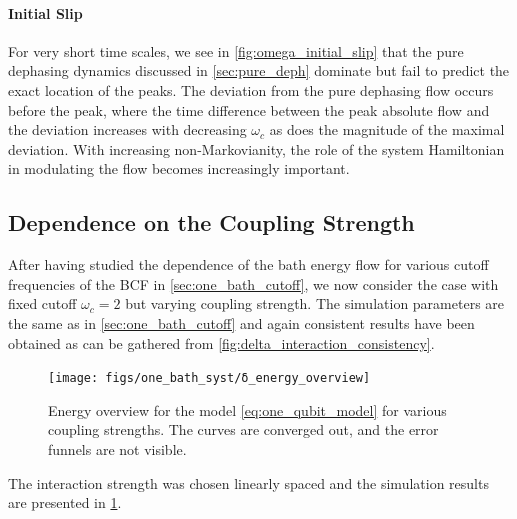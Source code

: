\paragraph{Initial Slip}
For very short time scales, we see in \cref{fig:omega_initial_slip}
that the pure dephasing dynamics discussed in \cref{sec:pure_deph}
dominate but fail to predict the exact location of the peaks. The
deviation from the pure dephasing flow occurs before the peak, where
the time difference between the peak absolute flow and the deviation
increases with decreasing \(ω_c\) as does the magnitude of the maximal
deviation. With increasing non-Markovianity, the role of the system
Hamiltonian in modulating the flow becomes increasingly important.

\subsection{Dependence on the Coupling Strength}
\label{sec:one_bathcoup_strength}
After having studied the dependence of the bath energy flow for
various cutoff frequencies of the BCF in \cref{sec:one_bath_cutoff},
we now consider the case with fixed cutoff \(ω_c=2\) but varying
coupling strength. The simulation parameters are the same as in
\cref{sec:one_bath_cutoff} and again consistent results have been
obtained as can be gathered from
\cref{fig:delta_interaction_consistency}.
\begin{figure}[h]
  \centering
  \texttt{[image: figs/one\_bath\_syst/δ\_energy\_overview]}
  \caption{\label{fig:delta_energy_overview} Energy overview for the
    model \cref{eq:one_qubit_model} for various coupling
    strengths. The curves are converged out, and the error funnels are
    not visible.}
\end{figure}

The interaction strength was chosen linearly spaced and the simulation
results are presented in \cref{fig:delta_energy_overview}.

